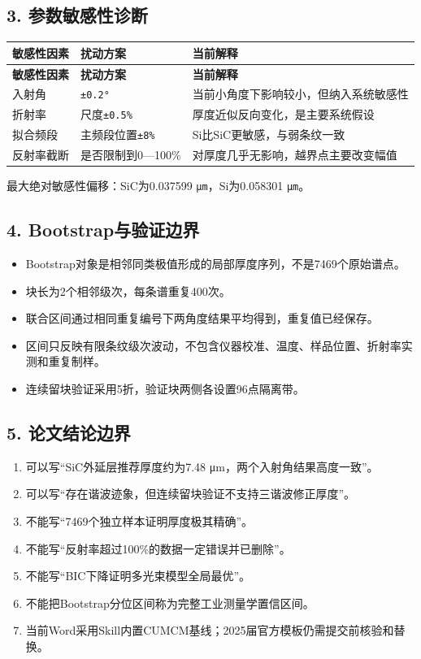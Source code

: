 \documentclass[11pt,a4paper]{ctexart}
\begin{document}
\subsection*{3. 参数敏感性诊断}
\begin{center}
\scriptsize
\begin{longtable}{|>{\raggedright\arraybackslash}p{}|>{\raggedright\arraybackslash}p{}|>{\raggedright\arraybackslash}p{}|}
\hline
\textbf{敏感性因素} & \textbf{扰动方案} & \textbf{当前解释} \\ \hline
\endfirsthead
\hline \textbf{敏感性因素} & \textbf{扰动方案} & \textbf{当前解释} \\ \hline
\endhead
入射角 & \texttt{±0.2°} & 当前小角度下影响较小，但纳入系统敏感性 \\ \hline
折射率 & 尺度\texttt{±0.5\%} & 厚度近似反向变化，是主要系统假设 \\ \hline
拟合频段 & 主频段位置\texttt{±8\%} & Si比SiC更敏感，与弱条纹一致 \\ \hline
反射率截断 & 是否限制到0—100\% & 对厚度几乎无影响，越界点主要改变幅值 \\ \hline
\end{longtable}
\normalsize
\end{center}
最大绝对敏感性偏移：SiC为0.037599 \texttt{μm}，Si为0.058301 \texttt{μm}。


\subsection*{4. Bootstrap与验证边界}
\begin{itemize}
\item Bootstrap对象是相邻同类极值形成的局部厚度序列，不是7469个原始谱点。
\item 块长为2个相邻级次，每条谱重复400次。
\item 联合区间通过相同重复编号下两角度结果平均得到，重复值已经保存。
\item 区间只反映有限条纹级次波动，不包含仪器校准、温度、样品位置、折射率实测和重复制样。
\item 连续留块验证采用5折，验证块两侧各设置96点隔离带。
\end{itemize}
\subsection*{5. 论文结论边界}
\begin{enumerate}
\item 可以写“SiC外延层推荐厚度约为7.48 μm，两个入射角结果高度一致”。
\item 可以写“存在谐波迹象，但连续留块验证不支持三谐波修正厚度”。
\item 不能写“7469个独立样本证明厚度极其精确”。
\item 不能写“反射率超过100\%的数据一定错误并已删除”。
\item 不能写“BIC下降证明多光束模型全局最优”。
\item 不能把Bootstrap分位区间称为完整工业测量学置信区间。
\item 当前Word采用Skill内置CUMCM基线；2025届官方模板仍需提交前核验和替换。
\end{enumerate}
\end{document}
